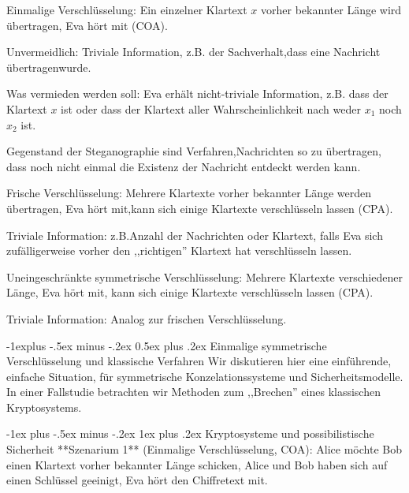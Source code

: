 \documentclass[a4paper]{article}
\makeatletter
\renewcommand{\subsection}{\@startsection{subsection}{2}{0mm}%
 {-1explus -.5ex minus -.2ex}%
 {0.5ex plus .2ex}%
 {\normalfont\normalsize\bfseries}}
\renewcommand{\subsubsection}{\@startsection{subsubsection}{3}{0mm}%
 {-1ex plus -.5ex minus -.2ex}%
 {1ex plus .2ex}%
 {\normalfont\small\bfseries}}
\makeatother
\begin{document}
\begin{multicols}{3}
    \begin{enumerate*}
        \item Einmalige Verschlüsselung: Ein einzelner Klartext $x$ vorher bekannter Länge wird übertragen, Eva hört mit (COA).
        \begin{itemize*}
            \item Unvermeidlich: Triviale Information, z.B. der Sachverhalt,dass eine Nachricht übertragenwurde.
            \item Was vermieden werden soll: Eva erhält nicht-triviale Information, z.B. dass der Klartext $x$ ist oder dass der Klartext aller Wahrscheinlichkeit nach weder $x_1$ noch $x_2$ ist.
            \item Gegenstand der Steganographie sind Verfahren,Nachrichten so zu übertragen, dass noch nicht einmal die Existenz der Nachricht entdeckt werden kann.
        \end{itemize*}
        \item  Frische Verschlüsselung: Mehrere Klartexte vorher bekannter Länge werden übertragen, Eva hört mit,kann sich einige Klartexte verschlüsseln lassen (CPA).
        \begin{itemize*}
            \item Triviale Information: z.B.Anzahl der Nachrichten oder Klartext, falls Eva sich zufälligerweise vorher den ,,richtigen'' Klartext hat verschlüsseln lassen.
        \end{itemize*}
        \item  Uneingeschränkte symmetrische Verschlüsselung: Mehrere Klartexte verschiedener Länge, Eva hört mit, kann sich einige Klartexte verschlüsseln lassen (CPA).
        \begin{itemize*}
            \item Triviale Information: Analog zur frischen Verschlüsselung.
        \end{itemize*}
    \end{enumerate*}

    \subsection{Einmalige symmetrische Verschlüsselung und klassische Verfahren}
    Wir diskutieren hier eine einführende, einfache Situation, für symmetrische Konzelationssysteme und Sicherheitsmodelle. In einer Fallstudie betrachten wir Methoden zum ,,Brechen'' eines klassischen Kryptosystems.

    \subsubsection{Kryptosysteme und possibilistische Sicherheit}
    **Szenarium 1** (Einmalige Verschlüsselung, COA): Alice möchte Bob einen Klartext vorher bekannter Länge schicken, Alice und Bob haben sich auf einen Schlüssel geeinigt, Eva hört den Chiffretext mit.


\end{multicols}
\end{document}
